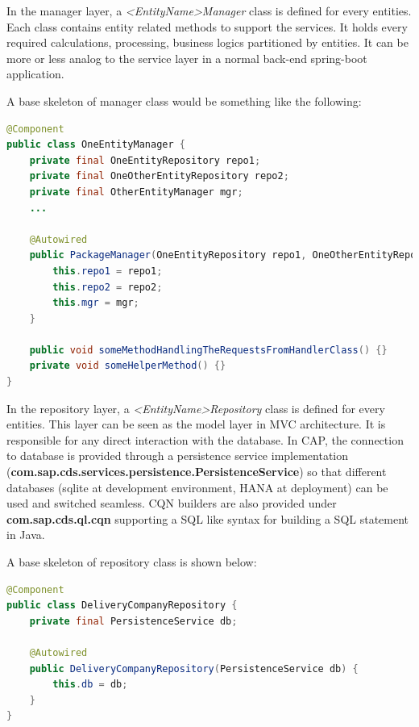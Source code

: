 \bigskip
In the manager layer, a \textit{<EntityName>Manager} class is defined for every entities. Each class contains entity related methods to support the services. It holds every required calculations, processing, business logics partitioned by entities. It can be more or less analog to the service layer in a normal back-end spring-boot application.

A base skeleton of manager class would be something like the following:

\begin{lstlisting}[language={java}]
@Component
public class OneEntityManager {
    private final OneEntityRepository repo1;
    private final OneOtherEntityRepository repo2;
    private final OtherEntityManager mgr;
    ...

    @Autowired
    public PackageManager(OneEntityRepository repo1, OneOtherEntityRepository repo2, OtherEntityManager mgr) {
        this.repo1 = repo1;
        this.repo2 = repo2;
        this.mgr = mgr;
    }

    public void someMethodHandlingTheRequestsFromHandlerClass() {}
    private void someHelperMethod() {}
}
\end{lstlisting}


\bigskip
In the repository layer, a \textit{<EntityName>Repository} class is defined for every entities. This layer can be seen as the model layer in MVC architecture. It is responsible for any direct interaction with the database. In CAP, the connection to database is provided through a persistence service implementation (\textbf{com.sap.cds.services.persistence.PersistenceService}) so that different databases (sqlite at development environment, HANA at deployment) can be used and switched seamless. CQN builders are also provided under \textbf{com.sap.cds.ql.cqn} supporting a SQL like syntax for building a SQL statement in Java.

 A base skeleton of repository class is shown below:

\begin{lstlisting}[language={java}]
@Component
public class DeliveryCompanyRepository {
    private final PersistenceService db;

    @Autowired
    public DeliveryCompanyRepository(PersistenceService db) {
        this.db = db;
    }
}
\end{lstlisting}

